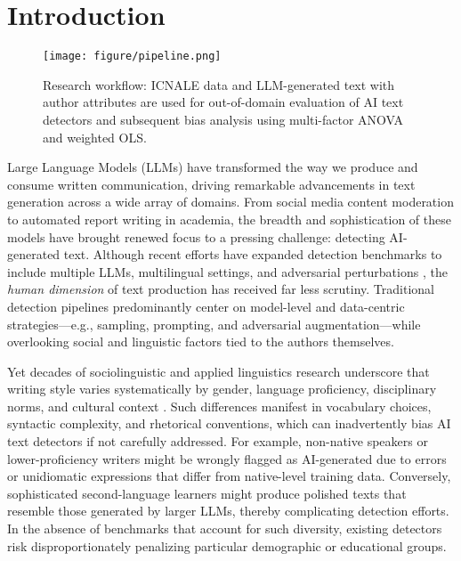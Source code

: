 \section{Introduction}
\begin{figure*}[!t]
    \centering
    \texttt{[image: figure/pipeline.png]}
    \caption{Research workflow: ICNALE data and LLM-generated text with author attributes are used for out-of-domain evaluation of AI text detectors and subsequent bias analysis using multi-factor ANOVA and weighted OLS.}
    \label{fig:workflow}
\end{figure*}

Large Language Models (LLMs) have transformed the way we produce and consume written communication, driving remarkable advancements in text generation across a wide array of domains. From social media content moderation to automated report writing in academia, the breadth and sophistication of these models have brought renewed focus to a pressing challenge: detecting AI-generated text. Although recent efforts have expanded detection benchmarks to include multiple LLMs, multilingual settings, and adversarial perturbations \citep{tao2024reliabledetectionllmgeneratedtexts, dugan2024raidsharedbenchmarkrobust, Li2024mage, wang2024m4gtbenchevaluationbenchmarkblackbox}, the \emph{human dimension} of text production has received far less scrutiny. Traditional detection pipelines predominantly center on model-level and data-centric strategies---e.g., sampling, prompting, and adversarial augmentation---while overlooking social and linguistic factors tied to the authors themselves.

Yet decades of sociolinguistic and applied linguistics research underscore that writing style varies systematically by gender, language proficiency, disciplinary norms, and cultural context \citep{hyland2000disciplinary, lantolf2000sociocultural, long1996role}. Such differences manifest in vocabulary choices, syntactic complexity, and rhetorical conventions, which can inadvertently bias AI text detectors if not carefully addressed. For example, non-native speakers or lower-proficiency writers might be wrongly flagged as AI-generated due to errors or unidiomatic expressions that differ from native-level training data. Conversely, sophisticated second-language learners might produce polished texts that resemble those generated by larger LLMs, thereby complicating detection efforts. In the absence of benchmarks that account for such diversity, existing detectors risk disproportionately penalizing particular demographic or educational groups.


